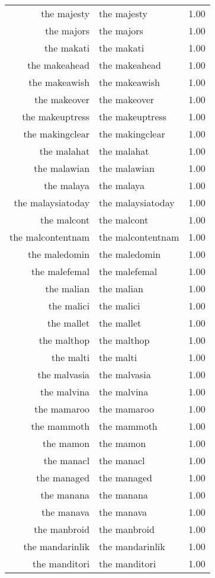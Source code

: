 \begin{table}[ht]
\begin{tabular}{rlr}
  the majesty & the majesty & 1.00 \\ 
  the majors & the majors & 1.00 \\ 
  the makati & the makati & 1.00 \\ 
  the makeahead & the makeahead & 1.00 \\ 
  the makeawish & the makeawish & 1.00 \\ 
  the makeover & the makeover & 1.00 \\ 
  the makeuptress & the makeuptress & 1.00 \\ 
  the makingclear & the makingclear & 1.00 \\ 
  the malahat & the malahat & 1.00 \\ 
  the malawian & the malawian & 1.00 \\ 
  the malaya & the malaya & 1.00 \\ 
  the malaysiatoday & the malaysiatoday & 1.00 \\ 
  the malcont & the malcont & 1.00 \\ 
  the malcontentnam & the malcontentnam & 1.00 \\ 
  the maledomin & the maledomin & 1.00 \\ 
  the malefemal & the malefemal & 1.00 \\ 
  the malian & the malian & 1.00 \\ 
  the malici & the malici & 1.00 \\ 
  the mallet & the mallet & 1.00 \\ 
  the malthop & the malthop & 1.00 \\ 
  the malti & the malti & 1.00 \\ 
  the malvasia & the malvasia & 1.00 \\ 
  the malvina & the malvina & 1.00 \\ 
  the mamaroo & the mamaroo & 1.00 \\ 
  the mammoth & the mammoth & 1.00 \\ 
  the mamon & the mamon & 1.00 \\ 
  the manacl & the manacl & 1.00 \\ 
  the managed & the managed & 1.00 \\ 
  the manana & the manana & 1.00 \\ 
  the manava & the manava & 1.00 \\ 
  the manbroid & the manbroid & 1.00 \\ 
  the mandarinlik & the mandarinlik & 1.00 \\ 
  the manditori & the manditori & 1.00 \\ 

\end{tabular}
\end{table}
